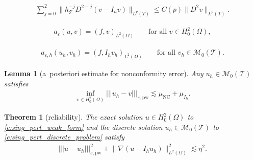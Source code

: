 \documentclass[10pt,a4paper]{amsart}
\newtheorem{theorem}{Theorem}
\newtheorem{lemma}{Lemma}
\newcommand{\ennorm}[1]{\lvert\!\lvert\!\lvert #1 \rvert\!\rvert\!\rvert}
\newcommand{\nc}{\mathrm{NC}}
\newcommand{\pw}{\mathrm{pw}}
\newcommand{\tri}{\mathcal{T}}
\begin{document}
\begin{align}\label{e:nodal_interpolation_approx}
    \sum_{j=0}^2 \lVert h_\tri^{-j}D^{2-j}(v-I_h v)\rVert_{L^p(T)} 
    \leq C(p) \lVert D^2 v\rVert_{L^p(T)}.
\end{align}

\begin{align}\label{e:sing_pert_weak_form}
    a_\varepsilon(u,v)=(f,v)_{L^2(\Omega)} 
    \qquad \text{for all }v\in H^2_0(\Omega),
\end{align}

\begin{align}\label{e:sing_pert_discrete_problem}
    a_{\varepsilon,h}(u_h,v_h) = (f,I_h v_h)_{L^2(\Omega)}
    \qquad \text{for all }v_h\in \mathcal{M}_0(\tri).
\end{align}

\begin{lemma}[a~posteriori estimate for nonconformity error]
    \label{l:sp_nc_estimator}
    Any $u_h\in\mathcal{M}_0(\tri)$ satisfies 
    \begin{align*}
        \inf_{v\in H^2_0(\Omega)} \ennorm{u_h-v}_{\varepsilon,\pw}
        \lesssim \mu_\nc + \mu_{I_h}.
    \end{align*}
\end{lemma}

\begin{theorem}[reliability]\label{t:sp_reliability}
    The exact solution $u\in H^2_0(\Omega)$ to \eqref{e:sing_pert_weak_form} 
    and the discrete solution $u_h\in \mathcal{M}_0(\tri)$ 
    to \eqref{e:sing_pert_discrete_problem} satisfy
    \begin{align*}
        \ennorm{u-u_h}_{\varepsilon,\pw}^2 
        + \lVert\nabla(u-I_h u_h)\rVert_{L^2(\Omega)}^2
        \lesssim \eta^2.
    \end{align*}
\end{theorem}
\end{document}
